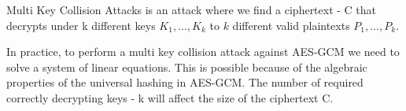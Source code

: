 Multi Key Collision Attacks is an attack where we find a ciphertext - C that decrypts under k different keys $K_{1},\ldots,K_{k}$ to
$k$ different valid plaintexts $P_{1},\ldots,P_{k}$.

In practice, to perform a multi key collision attack against AES-GCM
we need to solve a system of linear equations.
This is possible because of the algebraic properties of the universal hashing in AES-GCM.
The number of required correctly decrypting keys - k will affect the size of the ciphertext C.
